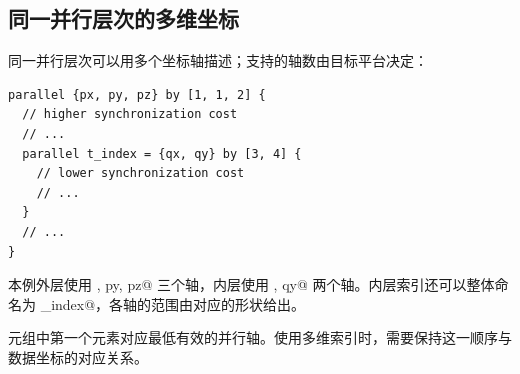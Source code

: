 \subsection*{同一并行层次的多维坐标}

同一并行层次可以用多个坐标轴描述；支持的轴数由目标平台决定：

\begin{lstlisting}[language=croqtile,caption={子级并行性}]
parallel {px, py, pz} by [1, 1, 2] {
  // higher synchronization cost
  // ...
  parallel t_index = {qx, qy} by [3, 4] {
    // lower synchronization cost
    // ...
  }
  // ...
}
\end{lstlisting}

本例外层使用 \co@px, py, pz@ 三个轴，内层使用 \co@qx, qy@ 两个轴。内层索引还可以整体命名为 \co@t_index@，各轴的范围由对应的形状给出。

元组中第一个元素对应最低有效的并行轴。使用多维索引时，需要保持这一顺序与数据坐标的对应关系。
